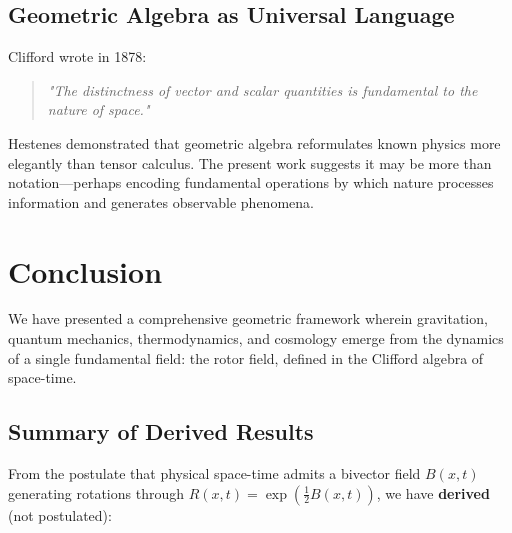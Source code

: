 \documentclass[11pt,a4paper]{article}
\numberwithin{equation}{section}
\theoremstyle{plain}
\theoremstyle{definition}
\theoremstyle{remark}
\begin{document}
\subsection{Geometric Algebra as Universal Language}

Clifford wrote in 1878:

\begin{quote}
\textit{"The distinctness of vector and scalar quantities is fundamental to the nature of space."}
\end{quote}

Hestenes demonstrated that geometric algebra reformulates known physics more elegantly than tensor calculus. The present work suggests it may be more than notation—perhaps encoding fundamental operations by which nature processes information and generates observable phenomena.

\section{Conclusion}
\label{sec:conclusion}

We have presented a comprehensive geometric framework wherein gravitation, quantum mechanics, thermodynamics, and cosmology emerge from the dynamics of a single fundamental field: the rotor field, defined in the Clifford algebra of space-time.

\subsection{Summary of Derived Results}

From the postulate that physical space-time admits a bivector field $B(x,t)$ generating rotations through $R(x,t) = \exp(\frac{1}{2}B(x,t))$, we have \textbf{derived} (not postulated):
\end{document}
